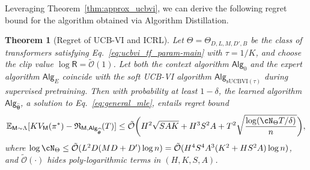 \documentclass[10pt]{article}
\newtheorem{theorem}{Theorem}
\newcommand{\<}{\left\langle}
\renewcommand{\>}{\right\rangle}
\newcommand{\E}{\mathbb{E}}
\newcommand{\inst}{{\mathsf{M}}}
\newcommand{\temp}{{\tau}}
\newcommand{\tcO}{{\tilde{\mathcal O}}}
\newcommand{\totlen}{{T}}
\newcommand{\sAlg}{{\mathsf{Alg}}}
\newcommand{\Numobs}{{n}}
\newcommand{\Parspace}{{\Theta}}
\newcommand{\esttfpar}{{\widehat{\btheta}}}
\newcommand{\plc}{{\pi}}
\newcommand{\prior}{{\Lambda}}
\newcommand{\Numepi}{{K}}
\newcommand{\horizon}{{H}}
\renewcommand{\horizon}{{H}}
\newcommand{\valuefun}{{V}}
\newcommand{\shortexp}{{E}}
\newcommand{\layer}{{L}}
\newcommand{\hidden}{{D'}}
\newcommand{\head}{{M}}
\newcommand{\clipval}{{\mathsf{R}}}
\newcommand{\embd}{{D}}
\newcommand{\totreward}{{\mathfrak{R}}}
\newcommand{\Numst}{{S}}
\newcommand{\Numact}{{A}}
\newcommand{\Vfun}{{\valuefun}}
\newcommand{\sUCBVI}{{\mathrm{sUCBVI}}}
\def\btheta{{\boldsymbol \theta}}
\begin{document}
Leveraging Theorem~\ref{thm:approx_ucbvi}, we can derive the following regret bound for the algorithm obtained via Algorithm Distillation.
\begin{theorem}[Regret of UCB-VI and ICRL]\label{thm:ucbvi_icrl-main}
Let $\Theta = \Theta_{D, L, M, \hidden, B}$ be the class of transformers satisfying Eq.~\eqref{eq:ucbvi_tf_param-main} with $\temp = 1/\Numepi$, and choose the clip value $\log \clipval = \tcO(1)$. Let both the context algorithm $\sAlg_0$ and the expert algorithm $\sAlg_\shortexp$ coincide with the soft UCB-VI algorithm $\sAlg_{\sUCBVI(\tau)}$ during supervised pretraining.  Then with probability at least $1-\delta$, the learned algorithm $\sAlg_{\esttfpar}$, a solution to Eq.~\eqref{eq:general_mle}, entails regret bound
\begin{align*}
\E_{\inst\sim\prior}[\Numepi\Vfun_\inst(\plc^*)-\totreward_{\inst,\sAlg_\esttfpar}(\totlen)]\leq \tcO \bigg(\horizon^2\sqrt{\Numst\Numact\Numepi}+\horizon^3\Numst^2\Numact+\totlen^2\sqrt{\frac{\log ( \cN_{\Parspace} \totlen/\delta ) }{n} } \bigg),
\end{align*}
where $\log \cN_{\Parspace} \le \tcO(\layer^2\embd(\head\embd+\hidden) \log\Numobs) = \tcO(\horizon^4\Numst^4\Numact^3(\Numepi^2+\horizon\Numst^2\Numact)\log\Numobs)$, and $\tcO(\cdot)$ hides poly-logarithmic terms in $(\horizon,\Numepi,\Numst,\Numact)$.
\end{theorem}
\end{document}
